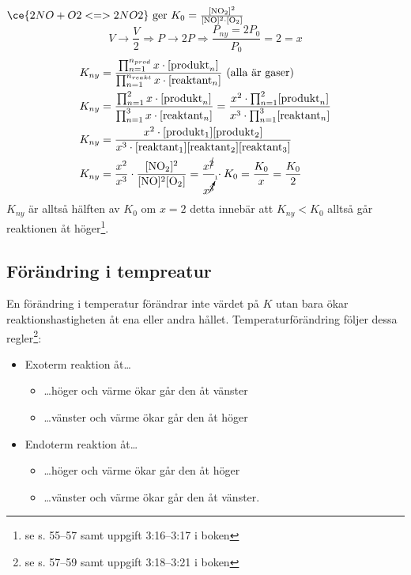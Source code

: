 \begin{exm}
    $\ce{2NO + O2 <=> 2NO2} \mathrm{\ ger \ } K_0=\frac{\mathrm{[NO_2]^2}}{\mathrm{[NO]^2 \cdot [O_2]}}$
    \begin{equation*}
        V \rightarrow \frac{V}{2} \Rightarrow P \rightarrow 2P \Rightarrow \frac{P_{ny}=2P_0}{P_0} = 2 = x
    \end{equation*}
    \begin{align*}
        K_{ny} &= \frac{\prod^{n_{prod}}_{n=1} x \cdot [\mathrm{produkt}_n]}{\prod^{n_{reakt}}_{n=1} x \cdot [\mathrm{reaktant}_n]} \text{ (alla är gaser)} \\
        K_{ny} &= \frac{\prod^{2}_{n=1} x \cdot [\mathrm{produkt}_n]}{\prod^{3}_{n=1} x \cdot [\mathrm{reaktant}_n]} = \frac{x^2 \cdot \prod^{2}_{n=1} [\mathrm{produkt}_n]}{x^3 \cdot \prod^{3}_{n=1} [\mathrm{reaktant}_n]} \\
        K_{ny} &= \frac{x^2 \cdot \mathrm{[produkt_1][produkt_2]}}{x^3 \cdot \mathrm{[reaktant_1][reaktant_2][reaktant_3]}} \\
        K_{ny} &= \frac{x^2}{x^3} \cdot \frac{\mathrm{[NO_2]^2}}{\mathrm{[NO]^2[O_2]}} = \frac{x^{\cancel{2}}}{x^{\cancelto{1}{3}}} \cdot K_0 = \frac{K_0}{x} = \frac{K_0}{2}
    \end{align*}
    $K_{ny}$ är alltså hälften av $K_0$ om $x=2$ detta innebär att $K_{ny} < K_0$ alltså går reaktionen åt höger\footnote{se s. 55--57 samt uppgift 3:16--3:17 i boken}.
\end{exm}

\pagebreak

\subsection{Förändring i tempreatur}
En förändring i temperatur förändrar inte värdet på $K$ utan bara ökar reaktionshastigheten åt ena eller andra hållet. Temperaturförändring följer dessa regler\footnote{se s. 57--59 samt uppgift 3:18--3:21 i boken}:
\begin{itemize}
    \item Exoterm reaktion åt\ldots
    \begin{itemize}
        \item \ldots höger och värme ökar går den åt vänster
        \item \ldots vänster och värme ökar går den åt höger
    \end{itemize}
    \item Endoterm reaktion åt\ldots
    \begin{itemize}
        \item \ldots höger och värme ökar går den åt höger
        \item \dots vänster och värme ökar går den åt vänster.
    \end{itemize}
\end{itemize}

